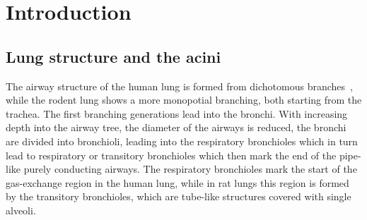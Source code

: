\documentclass[a4paper,DIVcalc,abstract,english]{scrartcl}
\newcommand{\meantotalnumberofacinirounded}{6400}
\newcommand{\meanacinarvolume}{1.148e-03} %
\newcommand{\meannumberofalveoli}{8470} %
\newcommand{\meanacinarsurface}{0.739} %
\newcommand{\meanairspacesurface}{4340} %
\begin{document}
\begin{abstract}
The difficulty of characterizing single respiratory functional units of the lung---the so-called acini---from two-dimensional physical sections leads to a limited knowledge about biological parameters like volume and surface.
By using high-resolution tomographic microscopic imaging we extracted individual acini from rat lung samples and estimated their volume, surface area and number of alveoli.
Acini were isolated from the distal-medial area of the right lower rat lung lobe by semiautomatically closing the transitory bronchioles at the transition from conducting to gas-exchanging airways.
The mean acinar volume was estimated to be \SI{\meanacinarvolume}{\centi\meter\cubed} and their mean surface area to be \SI{\meanacinarsurface}{\centi\meter\squared}.
Assuming that the acini are similarly sized throughout the different regions in the lung, we calculated that one rat lung contains approximately \meantotalnumberofacinirounded\xspace acini, each containing a mean of \meannumberofalveoli alveoli and an alveolar surface area of \SI{\meanairspacesurface}{\centi\metre\squared}.
Our proposed method of analyzing single ventilatory units of the mammalian lung is by magnitudes faster than manual stereological analysis of tissue slices and allows to extract biological parameters which cannot be extracted from classic single sections.
Additionally, the method makes it possible to assess the development of the acini and structural changes in the functional lung units over the postnatal lung development.
\end{abstract}
\clearpage

\section{Introduction}
\subsection{Lung structure and the acini}
The airway structure of the human lung is formed from dichotomous branches~\cite{Weibel1991}, while the rodent lung shows a more monopotial branching, both starting from the trachea.
The first branching generations lead into the bronchi.
With increasing depth into the airway tree, the diameter of the airways is reduced, the bronchi are divided into bronchioli, leading into the respiratory bronchioles which in turn lead to respiratory or transitory bronchioles which then mark the end of the pipe-like purely conducting airways.
The respiratory bronchioles mark the start of the gas-exchange region in the human lung, while in rat lungs this region is formed by the transitory bronchioles, which are tube-like structures covered with single alveoli.
\end{document}
